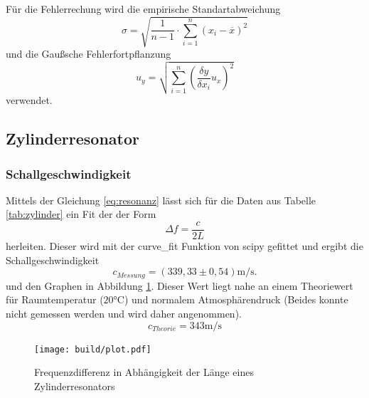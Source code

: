 Für die Fehlerrechung wird die empirische Standartabweichung
\begin{equation}
  \sigma = \sqrt{\frac{1}{n-1} \cdot \sum_{i=1}^n(x_i-\overline{x})^2}
  \label{eqn:Stdabweichung}
\end{equation}
und die Gaußsche Fehlerfortpflanzung
\begin{equation}
  u_y = \sqrt{\sum_{i=1}^n\left(\frac{\delta y}{\delta x_i}u_x\right)^2}
  \label{eqn:gauß}
\end{equation}
verwendet.

\subsection{Zylinderresonator}
\subsubsection{Schallgeschwindigkeit}
Mittels der Gleichung \eqref{eq:resonanz} lässt sich für die Daten aus Tabelle \ref{tab:zylinder} ein Fit der der Form
\begin{equation}
  \Delta f = \frac{c}{2L}
\end{equation}
herleiten. Dieser wird mit der curve\_fit Funktion von scipy \cite{scipy} gefittet und ergibt die Schallgeschwindigkeit
\begin{equation}
  c_{Messung} =(339,33\pm 0,54)\si{\metre\per\second}.
\end{equation}
und den Graphen in Abbildung \ref{fig:plot_zylinder}.
Dieser Wert liegt nahe an einem Theoriewert für Raumtemperatur ($20°$C) und normalem Atmosphärendruck (Beides konnte nicht gemessen werden und wird daher angenommen).
\begin{equation}
  c_{Theorie} =343\si{\metre\per\second}
\end{equation}


\begin{figure}
  \centering
  \texttt{[image: build/plot.pdf]}
  \caption{Frequenzdifferenz in Abhängigkeit der Länge eines Zylinderresonators}
  \label{fig:plot_zylinder}
\end{figure}

